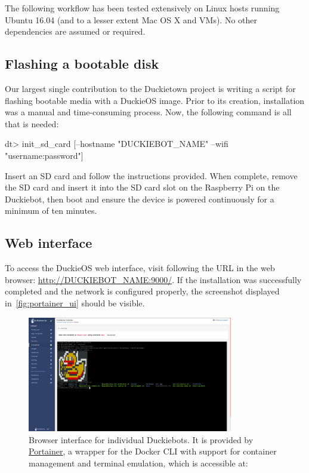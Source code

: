 \documentclass[12pt,initial,twoside,maitrise]{dms}
\numberwithin{equation}{section}
\numberwithin{table}{chapter}
\numberwithin{figure}{chapter}
\begin{document}
The following workflow has been tested extensively on Linux hosts running Ubuntu 16.04 (and to a lesser extent Mac OS X and VMs). No other dependencies are assumed or required.

\subsection{Flashing a bootable disk}

Our largest single contribution to the Duckietown project is writing a script for flashing bootable media with a DuckieOS image. Prior to its creation, installation was a manual and time-consuming process. Now, the following command is all that is needed:

\begin{dtslisting}
dt> init_sd_card [--hostname "DUCKIEBOT_NAME" --wifi "username:password"]
\end{dtslisting}
%
Insert an SD card and follow the instructions provided. When complete, remove the SD card and insert it into the SD card slot on the Raspberry Pi on the Duckiebot, then boot and ensure the device is powered continuously for a minimum of ten minutes.

\subsection{Web interface}

To access the DuckieOS web interface, visit following the URL in the web browser: \url{http://DUCKIEBOT_NAME:9000/}. If the installation was successfully completed and the network is configured properly, the screenshot displayed in~\autoref{fig:portainer_ui} should be visible.

\begin{figure}
    \includegraphics[width=0.80\textwidth]{portainer_screenshot.png}
    \caption{Browser interface for individual Duckiebots. It is provided by \href{https://www.portainer.io/}{Portainer}, a wrapper for the Docker CLI with support for container management and terminal emulation, which is accessible at: }
    \label{fig:portainer_ui}
\end{figure}
\end{document}
